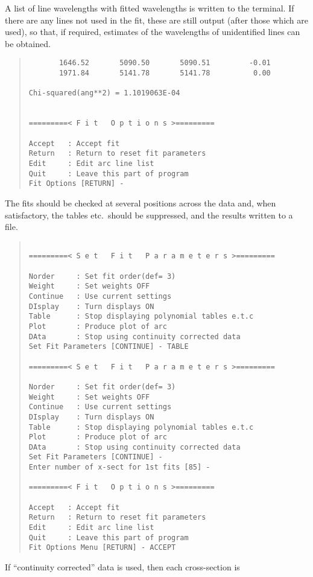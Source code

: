 A list of line wavelengths with fitted wavelengths is written to
the terminal. If there are any lines not used in the fit, these are
still output (after those which are used), so that, if required,
estimates of the wavelengths of unidentified lines can be obtained.
\begin{quote}\begin{verbatim}
       1646.52       5090.50       5090.51         -0.01
       1971.84       5141.78       5141.78          0.00

Chi-squared(ang**2) = 1.1019063E-04
 

=========< F i t   O p t i o n s >=========

Accept   : Accept fit
Return   : Return to reset fit parameters
Edit     : Edit arc line list
Quit     : Leave this part of program
Fit Options [RETURN] -
\end{verbatim}\end{quote}
The fits should be checked at several positions across the data and,
when satisfactory, the tables etc.\ should be suppressed, and the
results written to a file.
\begin{quote}\begin{verbatim}

=========< S e t   F i t   P a r a m e t e r s >=========

Norder     : Set fit order(def= 3)
Weight     : Set weights OFF
Continue   : Use current settings
DIsplay    : Turn displays ON
Table      : Stop displaying polynomial tables e.t.c
Plot       : Produce plot of arc
DAta       : Stop using continuity corrected data
Set Fit Parameters [CONTINUE] - TABLE

=========< S e t   F i t   P a r a m e t e r s >=========

Norder     : Set fit order(def= 3)
Weight     : Set weights OFF
Continue   : Use current settings
DIsplay    : Turn displays ON
Table      : Stop displaying polynomial tables e.t.c
Plot       : Produce plot of arc
DAta       : Stop using continuity corrected data
Set Fit Parameters [CONTINUE] -
Enter number of x-sect for 1st fits [85] -

=========< F i t   O p t i o n s >=========

Accept   : Accept fit
Return   : Return to reset fit parameters
Edit     : Edit arc line list
Quit     : Leave this part of program
Fit Options Menu [RETURN] - ACCEPT
\end{verbatim}\end{quote}
If ``continuity corrected'' data is used, then each cross-section is
